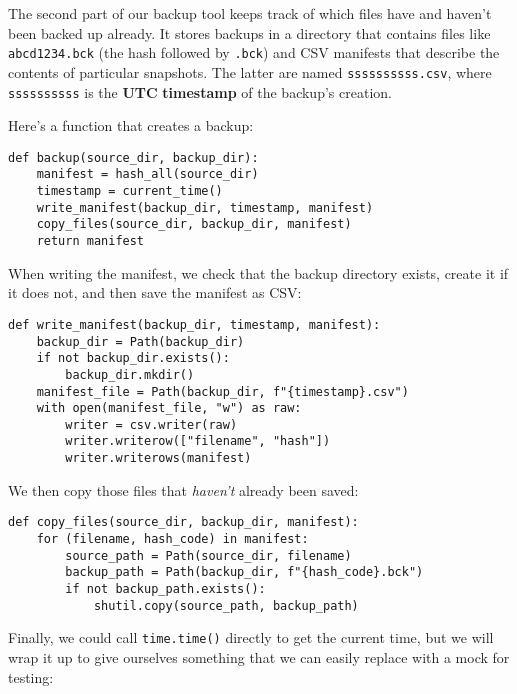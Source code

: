 \documentclass{scrbook}
\newcommand{\glossref}[1]{\textbf{#1}}
\begin{document}
The second part of our backup tool keeps track of which files have and haven't been backed up already.
It stores backups in a directory that contains files like \texttt{abcd1234.bck}
(the hash followed by \texttt{.bck})
and CSV manifests that describe the contents of particular snapshots.
The latter are named \texttt{ssssssssss.csv},
where \texttt{ssssssssss} is the \glossref{UTC} \glossref{timestamp} of the backup's creation.



Here's a function that creates a backup:


\begin{lstlisting}[frame=single,frameround=tttt]
def backup(source_dir, backup_dir):
    manifest = hash_all(source_dir)
    timestamp = current_time()
    write_manifest(backup_dir, timestamp, manifest)
    copy_files(source_dir, backup_dir, manifest)
    return manifest
\end{lstlisting}



When writing the manifest,
we check that the backup directory exists,
create it if it does not,
and then save the manifest as CSV:


\begin{lstlisting}[frame=single,frameround=tttt]
def write_manifest(backup_dir, timestamp, manifest):
    backup_dir = Path(backup_dir)
    if not backup_dir.exists():
        backup_dir.mkdir()
    manifest_file = Path(backup_dir, f"{timestamp}.csv")
    with open(manifest_file, "w") as raw:
        writer = csv.writer(raw)
        writer.writerow(["filename", "hash"])
        writer.writerows(manifest)
\end{lstlisting}



\noindent We then copy those files that \emph{haven't} already been saved:


\begin{lstlisting}[frame=single,frameround=tttt]
def copy_files(source_dir, backup_dir, manifest):
    for (filename, hash_code) in manifest:
        source_path = Path(source_dir, filename)
        backup_path = Path(backup_dir, f"{hash_code}.bck")
        if not backup_path.exists():
            shutil.copy(source_path, backup_path)
\end{lstlisting}



\noindent Finally,
we could call \texttt{time.time()} directly to get the current time,
but we will wrap it up to give ourselves something
that we can easily replace with a mock for testing:
\end{document}

